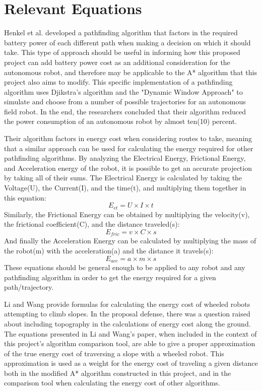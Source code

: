 \section{Relevant Equations}
Henkel et al. \cite{henkel2016energy} developed a pathfinding algorithm that factors in the required battery power of each different path when making a decision on which it should take. This type of approach should be useful in informing how this proposed project can add battery power cost as an additional consideration for the autonomous robot, and therefore may be applicable to the A* algorithm that this project also aims to modify. This specific implementation of a pathfinding algorithm uses Djikstra's algorithm and the "Dynamic Window Approach" to simulate and choose from a number of possible trajectories for an autonomous field robot. In the end, the researchers concluded that their algorithm reduced the power consumption of an autonomous robot by almost ten(10) percent.
\par
Their algorithm factors in energy cost when considering routes to take\cite{henkel2016energy}, meaning that a similar approach can be used for calculating the energy required for other pathfinding algorithms. By analyzing the Electrical Energy, Frictional Energy, and Acceleration energy of the robot, it is possible to get an accurate projection by taking all of their sums. The Electrical Energy is calculated by taking the Voltage(U), the Current(I), and the time(t), and multiplying them together in this equation:\begin{equation}
    E_{et} = U\times I\times t
\end{equation}
Similarly, the Frictional Energy can be obtained by multiplying the velocity(v), the frictional coefficient(C), and the distance traveled(s):\begin{equation}
    E_{fric} = v \times C \times s
\end{equation}
And finally the Acceleration Energy can be calculated by multiplying the mass of the robot(m) with the acceleration(a) and the distance it travels(s):\begin{equation}
    E_{acc} = a \times m \times s
\end{equation}
These equations\cite{henkel2016energy} should be general enough to be applied to any robot and any pathfinding algorithm in order to get the energy required for a given path/trajectory.
\par
Li and Wang \cite{li2014coordinated} provide formulas for calculating the energy cost of wheeled robots attempting to climb slopes. In the proposal defense, there was a question raised about including topography in the calculations of energy cost along the ground. The equations presented in Li and Wang's paper, when included in the context of this project's algorithm comparison tool, are able to give a proper approximation of the true energy cost of traversing a slope with a wheeled robot. This approximation is used as a weight for the energy cost of traveling a given distance both in the modified A* algorithm constructed in this project, and in the comparison tool when calculating the energy cost of other algorithms.
